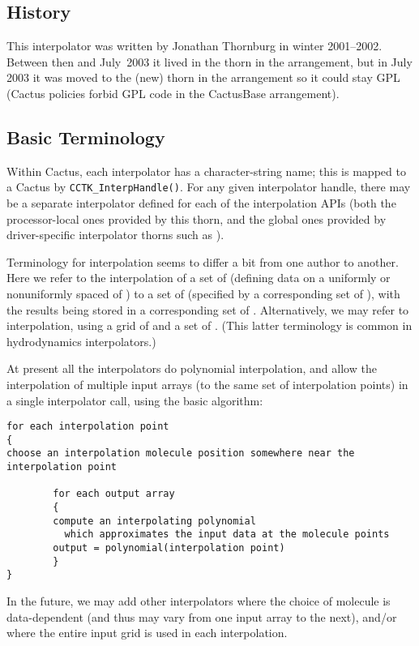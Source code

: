 
\subsection{History}

This interpolator was written by Jonathan Thornburg in winter 2001--2002.
Between then and July~2003 it lived in the
 thorn in the  arrangement,
but in July 2003 it was moved to the (new)
 thorn in the  arrangement
so it could stay GPL
(Cactus policies forbid GPL code in the CactusBase arrangement).


\subsection{Basic Terminology}
\label{AEIThorns/AEILocalInterp/sect-basic-terminology}

Within Cactus, each interpolator has a character-string name;
this is mapped to a Cactus  by
\verb|CCTK_InterpHandle()|.  For any given interpolator handle,
there may be a separate interpolator defined for each of the
interpolation APIs (both the processor-local ones provided by this
thorn, and the global ones provided by driver-specific interpolator
thorns such as ).

Terminology for interpolation seems to differ a bit from one author
to another.  Here we refer to the  interpolation
of a set of  (defining data on a uniformly or
nonuniformly spaced  of ) to a set of
 (specified by a corresponding set of
), with the results being stored
in a corresponding set of .  Alternatively,
we may refer to  interpolation, using a grid
of  and a set of .
(This latter terminology is common in hydrodynamics interpolators.)

At present all the interpolators do polynomial interpolation, and
allow the interpolation of multiple input arrays (to the same set of
interpolation points) in a single interpolator call, using the basic
algorithm:
\begin{verbatim}
for each interpolation point
{
choose an interpolation molecule position somewhere near the interpolation point

        for each output array
        {
        compute an interpolating polynomial
          which approximates the input data at the molecule points
        output = polynomial(interpolation point)
        }
}
\end{verbatim}
In the future, we may add other interpolators where the choice of
molecule is data-dependent (and thus may vary from one input array to
the next), and/or where the entire input grid is used in each interpolation.

